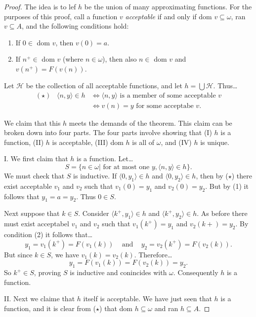\begin{proof}
The idea is to lef $h$ be the union of many approximating functions. For the purposes of this proof, call a function $v$ \emph{acceptable}
if and only if dom $v \subseteq \omega$, ran $v \subseteq A$, and the following conditions hold:
\begin{enumerate}
  \item If $0 \in$ dom $v$, then $v(0) = a$.
  \item If $n^+ \in$ dom $v$ (where $n \in \omega$), then also $n \in$ dom $v$ and $v(n^+) = F(v(n))$.
\end{enumerate}

Let $\mathcal{H}$ be the collection of all acceptable functions, and let $h = \bigcup \mathcal{H}.$ Thus\dots
\begin{align*}
(\star) \; \; \; \langle n, y \rangle \in h &\Leftrightarrow \langle n, y \rangle \textrm{ is a member of some acceptable } v\\
 						   &\Leftrightarrow v(n) = y \textrm{ for some acceptabe } v.
\end{align*}

We claim that this $h$ meets the demands of the theorem. This claim can be broken down into four parts. The four parts involve showing that (I) $h$ is a function,
(II) $h$ is acceptable, (III) dom $h$ is all of $\omega$, and (IV) $h$ is unique.\newline


I. We first claim that $h$ is a function. Let\dots
$$S = \{ n \in \omega | \textrm{ for at most one } y, \langle n, y \rangle \in h \}.$$
We must check that $S$ is inductive. If $\langle 0, y_1 \rangle \in h$ and $\langle 0, y_2 \rangle \in h$, then by ($\star$) there exist acceptable $v_1$ and $v_2$
such that $v_1(0) = y_1$ and $v_2(0)=y_2$. But by (1) it follows that $y_1 = a = y_2$. Thus $0 \in S$.

Next suppose that $k \in S$. Consider $\langle k^+, y_1 \rangle \in h$ and $\langle k^+, y_2 \rangle \in h.$ As before there must exist acceptabel $v_1$ and $v_2$ such that
$v_1(k^+) = y_1$ and $v_2(k+) = y_2.$ By condition (2) it follows that\dots
$$y_1 = v_1(k^+) = F(v_1(k)) \; \; \; \textrm{ and } \; \; \; y_2 = v_2(k^+) = F(v_2(k)).$$
But since $k \in S$, we have $v_1(k) = v_2(k).$ Therefore\dots
$$y_1 = F(v_1(k)) = F(v_2(k)) = y_2.$$
So $k^+ \in S$, proving $S$ is inductive and conincides with $\omega$. Consequently $h$ is a function.\newline


II. Next we claime that $h$ itself is acceptable. We have just seen that $h$ is a function, and it is clear from ($\star$) that dom $h \subseteq \omega$ and ran $h \subseteq A.$


\end{proof}
